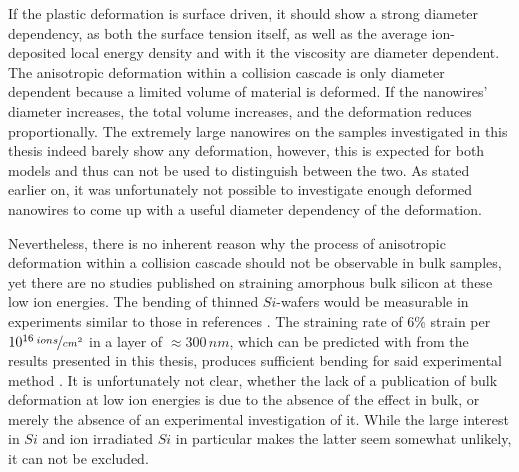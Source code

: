 If the plastic deformation is surface driven, it should show a strong diameter dependency, as both the surface tension itself, as well as the average ion-deposited local energy density and with it the viscosity are diameter dependent. The anisotropic deformation within a collision cascade is only diameter dependent because a limited volume of material is  deformed. If the nanowires' diameter increases, the total volume increases, and the deformation reduces proportionally. The extremely large nanowires on the samples investigated in this thesis indeed barely show any deformation, however, this is expected for both models and thus can not be used to distinguish between the two. As stated earlier on, it was unfortunately not possible to investigate enough deformed nanowires to come up with a useful diameter dependency of the deformation.

Nevertheless, there is no inherent reason why the process of anisotropic deformation within a collision cascade should not be observable in bulk samples, yet there are no studies published on straining amorphous bulk silicon at these low ion energies. The bending of thinned $Si$-wafers would be measurable in experiments similar to those in references \cite{volkert_stress_1991,massl_stress_2008}. The straining rate of $6\%$ strain per $10^{16}\,\nicefrac{ions}{cm^2}$ in a layer of $\approx 300\,nm$, which can be predicted with from the results presented in this thesis, produces sufficient bending for said experimental method \cite{flinn_measurement_1987}. It is unfortunately not clear, whether the lack of a publication of bulk deformation at low ion energies is due to the absence of the effect in bulk, or merely the absence of an experimental investigation of it. While the large interest in $Si$ and ion irradiated $Si$ in particular makes the latter seem somewhat unlikely, it can not be excluded.


